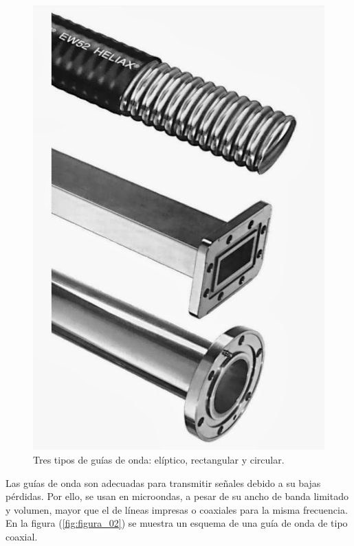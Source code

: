 \begin{figure}[H]
    \centering
    \includegraphics[scale=0.25]{Imagenes/Tubos_Guias_Onda.jpg}
    \caption{Tres tipos de guías de onda: elíptico, rectangular y circular.}
    \label{fig:figura_01}
\end{figure}

Las guías de onda son adecuadas para transmitir señales debido a su bajas pérdidas. Por ello, se usan en microondas, a pesar de su ancho de banda limitado y volumen, mayor que el de líneas impresas o coaxiales para la misma frecuencia. En la figura (\ref{fig:figura_02}) se muestra un esquema de una guía de onda de tipo coaxial.

